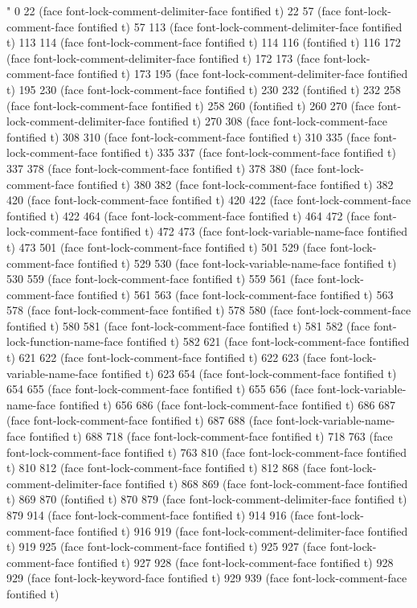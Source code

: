 {%
%
" 0 22 (face font-lock-comment-delimiter-face fontified t) 22 57 (face font-lock-comment-face fontified t) 57 113 (face font-lock-comment-delimiter-face fontified t) 113 114 (face font-lock-comment-face fontified t) 114 116 (fontified t) 116 172 (face font-lock-comment-delimiter-face fontified t) 172 173 (face font-lock-comment-face fontified t) 173 195 (face font-lock-comment-delimiter-face fontified t) 195 230 (face font-lock-comment-face fontified t) 230 232 (fontified t) 232 258 (face font-lock-comment-face fontified t) 258 260 (fontified t) 260 270 (face font-lock-comment-delimiter-face fontified t) 270 308 (face font-lock-comment-face fontified t) 308 310 (face font-lock-comment-face fontified t) 310 335 (face font-lock-comment-face fontified t) 335 337 (face font-lock-comment-face fontified t) 337 378 (face font-lock-comment-face fontified t) 378 380 (face font-lock-comment-face fontified t) 380 382 (face font-lock-comment-face fontified t) 382 420 (face font-lock-comment-face fontified t) 420 422 (face font-lock-comment-face fontified t) 422 464 (face font-lock-comment-face fontified t) 464 472 (face font-lock-comment-face fontified t) 472 473 (face font-lock-variable-name-face fontified t) 473 501 (face font-lock-comment-face fontified t) 501 529 (face font-lock-comment-face fontified t) 529 530 (face font-lock-variable-name-face fontified t) 530 559 (face font-lock-comment-face fontified t) 559 561 (face font-lock-comment-face fontified t) 561 563 (face font-lock-comment-face fontified t) 563 578 (face font-lock-comment-face fontified t) 578 580 (face font-lock-comment-face fontified t) 580 581 (face font-lock-comment-face fontified t) 581 582 (face font-lock-function-name-face fontified t) 582 621 (face font-lock-comment-face fontified t) 621 622 (face font-lock-comment-face fontified t) 622 623 (face font-lock-variable-name-face fontified t) 623 654 (face font-lock-comment-face fontified t) 654 655 (face font-lock-comment-face fontified t) 655 656 (face font-lock-variable-name-face fontified t) 656 686 (face font-lock-comment-face fontified t) 686 687 (face font-lock-comment-face fontified t) 687 688 (face font-lock-variable-name-face fontified t) 688 718 (face font-lock-comment-face fontified t) 718 763 (face font-lock-comment-face fontified t) 763 810 (face font-lock-comment-face fontified t) 810 812 (face font-lock-comment-face fontified t) 812 868 (face font-lock-comment-delimiter-face fontified t) 868 869 (face font-lock-comment-face fontified t) 869 870 (fontified t) 870 879 (face font-lock-comment-delimiter-face fontified t) 879 914 (face font-lock-comment-face fontified t) 914 916 (face font-lock-comment-face fontified t) 916 919 (face font-lock-comment-delimiter-face fontified t) 919 925 (face font-lock-comment-face fontified t) 925 927 (face font-lock-comment-face fontified t) 927 928 (face font-lock-comment-face fontified t) 928 929 (face font-lock-keyword-face fontified t) 929 939 (face font-lock-comment-face fontified t) }
